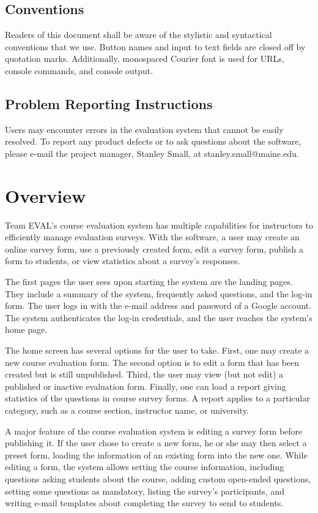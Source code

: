 \documentclass{article}
\begin{document}
\subsection{Conventions}

Readers of this document shall be aware of the stylistic and syntactical conventions that we use. Button names and input to text fields are closed off by quotation marks. Additionally, monospaced Courier font is used for URLs, console commands, and console output.

\subsection{Problem Reporting Instructions}

Users may encounter errors in the evaluation system that cannot be easily resolved. To report any product defects or to ask questions about the software, please e-mail the project manager, Stanley Small, at stanley.small@maine.edu.

\section{Overview}

Team EVAL's course evaluation system has multiple capabilities for instructors to efficiently manage evaluation surveys. With the software, a user may create an online survey form, use a previously created form, edit a survey form, publish a form to students, or view statistics about a survey's responses.

The first pages the user sees upon starting the system are the landing pages. They include a summary of the system, frequently asked questions, and the log-in form. The user logs in with the e-mail address and password of a Google account. The system authenticates the log-in credentials, and the user reaches the system's home page.

The home screen has several options for the user to take. First, one may create a new course evaluation form. The second option is to edit a form that has been created but is still unpublished. Third, the user may view (but not edit) a published or inactive evaluation form. Finally, one can load a report giving statistics of the questions in course survey forms. A report applies to a particular category, such as a course section, instructor name, or university.

A major feature of the course evaluation system is editing a survey form before publishing it. If the user chose to create a new form, he or she may then select a preset form, loading the information of an existing form into the new one. While editing a form, the system allows setting the course information, including questions asking students about the course, adding custom open-ended questions, setting some questions as mandatory, listing the survey's participants, and writing e-mail templates about completing the survey to send to students.
\end{document}
